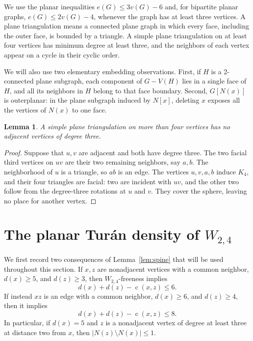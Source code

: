\documentclass[11pt,a4paper]{article}
\newtheorem{lemma}[theorem]{Lemma}
\theoremstyle{remark}
\newcommand{\cdeg}{\operatorname{c}}
\begin{document}
We use the planar inequalities $e(G)\le3v(G)-6$ and, for bipartite planar graphs, $e(G)\le2v(G)-4$, whenever the graph has at least three vertices. A plane triangulation means a connected plane graph in which every face, including the outer face, is bounded by a triangle. A simple plane triangulation on at least four vertices has minimum degree at least three, and the neighbors of each vertex appear on a cycle in their cyclic order.

We will also use two elementary embedding observations. First, if $H$ is a 2-connected plane subgraph, each component of $G-V(H)$ lies in a single face of $H$, and all its neighbors in $H$ belong to that face boundary. Second, $G[N(x)]$ is outerplanar: in the plane subgraph induced by $N[x]$, deleting $x$ exposes all the vertices of $N(x)$ to one face.

\begin{lemma}\label{lem:adjacent-three}
A simple plane triangulation on more than four vertices has no adjacent vertices of degree three.
\end{lemma}

\begin{proof}
Suppose that $u,v$ are adjacent and both have degree three. The two facial third vertices on $uv$ are their two remaining neighbors, say $a,b$. The neighborhood of $u$ is a triangle, so $ab$ is an edge. The vertices $u,v,a,b$ induce $K_4$, and their four triangles are facial: two are incident with $uv$, and the other two follow from the degree-three rotations at $u$ and $v$. They cover the sphere, leaving no place for another vertex.
\end{proof}



\section{The planar Tur\'an density of \texorpdfstring{$W_{2,4}$}{W(2,4)}}
\label{sec:w24}

We first record two consequences of Lemma~\ref{lem:spine} that will be
used throughout this section. If $x,z$ are nonadjacent vertices with a
common neighbor, $d(x)\geq5$, and $d(z)\geq3$, then $W_{2,4}$-freeness
implies
\begin{equation}\label{eq:w24nonadj}
 d(x)+d(z)-\cdeg(x,z)\leq6.
\end{equation}
If instead $xz$ is an edge with a common neighbor, $d(x)\geq6$, and
$d(z)\geq4$, then it implies
\begin{equation}\label{eq:w24adj}
 d(x)+d(z)-\cdeg(x,z)\leq8.
\end{equation}
In particular, if $d(x)=5$ and $z$ is a nonadjacent vertex of degree
at least three at distance two from $x$, then
$|N(z)\setminus N(x)|\leq1$.
\end{document}
